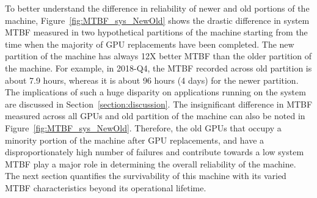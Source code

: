 To better understand the difference in reliability of newer and old portions of the machine, 
Figure~\ref{fig:MTBF_sys_NewOld} shows the drastic difference in system MTBF measured in two hypothetical
partitions of the machine starting from the time when the majority of GPU replacements have been completed. 
The new partition of the machine has always 12X better MTBF than the older partition
of the machine. For example, in 2018-Q4, the MTBF recorded across old partition is about 7.9 hours, whereas it is about
96 hours (4 days) for the newer partition. The implications of such a huge disparity on applications running on the 
system are discussed in Section~\ref{section:discussion}. The insignificant difference in MTBF measured across all GPUs and
old partition of the machine can also be noted in Figure~\ref{fig:MTBF_sys_NewOld}.  
Therefore, the old GPUs that occupy a minority portion of the machine after GPU replacements, 
and have a disproportionately high number of failures and contribute towards a low system MTBF play a major role 
in determining the overall reliability of the machine.
The next section quantifies the survivability of this machine with its varied MTBF characteristics beyond its operational lifetime.

